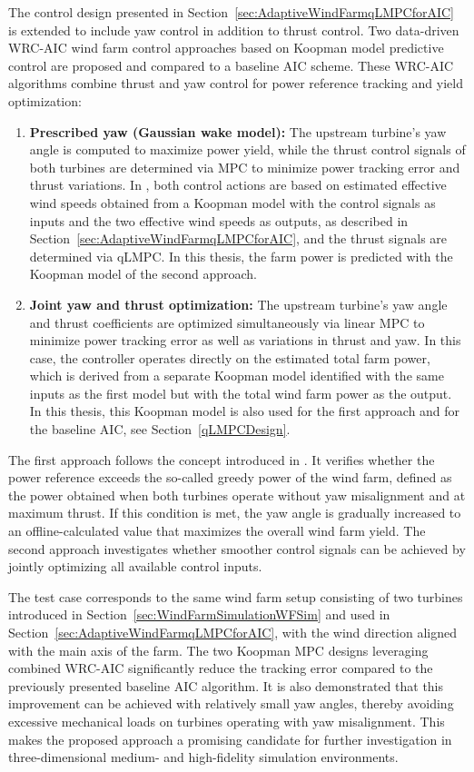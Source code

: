 The control design presented in Section~\ref{sec:AdaptiveWindFarmqLMPCforAIC} is extended to include yaw control in addition to thrust control. Two data-driven WRC-AIC wind farm control approaches based on Koopman model predictive control are proposed and compared to a baseline AIC scheme. These WRC-AIC algorithms combine thrust and yaw control for power reference tracking and yield optimization:
\begin{enumerate}
    \item \textbf{Prescribed yaw (Gaussian wake model):}  
    The upstream turbine's yaw angle is computed to maximize power yield, while the thrust control signals of both turbines are determined via MPC to minimize power tracking error and thrust variations. In \cite{dittmer2023koopman}, both control actions are based on estimated effective wind speeds obtained from a Koopman model with the control signals as inputs and the two effective wind speeds as outputs, as described in Section~\ref{sec:AdaptiveWindFarmqLMPCforAIC}, and the thrust signals are determined via qLMPC. In this thesis, the farm power is predicted with the Koopman model of the second approach.
    
    \item \textbf{Joint yaw and thrust optimization:}  
    The upstream turbine's yaw angle and thrust coefficients are optimized simultaneously via linear MPC to minimize power tracking error as well as variations in thrust and yaw. In this case, the controller operates directly on the estimated total farm power, which is derived from a separate Koopman model identified with the same inputs as the first model but with the total wind farm power as the output. In this thesis, this Koopman model is also used for the first approach and for the baseline AIC, see Section~\ref{qLMPCDesign}.
\end{enumerate}
The first approach follows the concept introduced in \cite{boersma2017tutorial}. It verifies whether the power reference exceeds the so-called greedy power of the wind farm, defined as the power obtained when both turbines operate without yaw misalignment and at maximum thrust. If this condition is met, the yaw angle is gradually increased to an offline-calculated value that maximizes the overall wind farm yield. The second approach investigates whether smoother control signals can be achieved by jointly optimizing all available control inputs.

The test case corresponds to the same wind farm setup consisting of two turbines introduced in Section~\ref{sec:WindFarmSimulationWFSim} and used in Section~\ref{sec:AdaptiveWindFarmqLMPCforAIC}, with the wind direction aligned with the main axis of the farm. The two Koopman MPC designs leveraging combined WRC-AIC significantly reduce the tracking error compared to the previously presented baseline AIC algorithm. It is also demonstrated that this improvement can be achieved with relatively small yaw angles, thereby avoiding excessive mechanical loads on turbines operating with yaw misalignment. This makes the proposed approach a promising candidate for further investigation in three-dimensional medium- and high-fidelity simulation environments.


